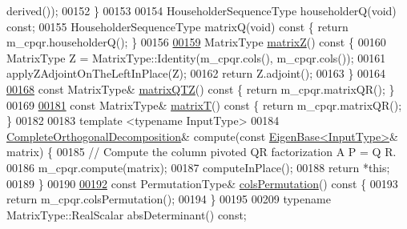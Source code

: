 \begin{DoxyCode}
      derived());
00152   \}
00153 
00154   HouseholderSequenceType householderQ(\textcolor{keywordtype}{void}) \textcolor{keyword}{const};
00155   HouseholderSequenceType matrixQ(\textcolor{keywordtype}{void})\textcolor{keyword}{ const }\{ \textcolor{keywordflow}{return} m\_cpqr.householderQ(); \}
00156 
\hyperlink{group___q_r___module_a4cd178f13aefe5189d4beeb3eb1c5897}{00159}   MatrixType \hyperlink{group___q_r___module_a4cd178f13aefe5189d4beeb3eb1c5897}{matrixZ}()\textcolor{keyword}{ const }\{
00160     MatrixType Z = MatrixType::Identity(m\_cpqr.cols(), m\_cpqr.cols());
00161     applyZAdjointOnTheLeftInPlace(Z);
00162     \textcolor{keywordflow}{return} Z.adjoint();
00163   \}
00164 
\hyperlink{group___q_r___module_ad89e2529fc1a8721239d9b6be9613a69}{00168}   \textcolor{keyword}{const} MatrixType& \hyperlink{group___q_r___module_ad89e2529fc1a8721239d9b6be9613a69}{matrixQTZ}()\textcolor{keyword}{ const }\{ \textcolor{keywordflow}{return} m\_cpqr.matrixQR(); \}
00169 
\hyperlink{group___q_r___module_a806213f5c96ff765265f47067229586d}{00181}   \textcolor{keyword}{const} MatrixType& \hyperlink{group___q_r___module_a806213f5c96ff765265f47067229586d}{matrixT}()\textcolor{keyword}{ const }\{ \textcolor{keywordflow}{return} m\_cpqr.matrixQR(); \}
00182 
00183   \textcolor{keyword}{template} <\textcolor{keyword}{typename} InputType>
00184   \hyperlink{group___q_r___module_class_eigen_1_1_complete_orthogonal_decomposition}{CompleteOrthogonalDecomposition}& compute(\textcolor{keyword}{const} 
      \hyperlink{group___core___module_struct_eigen_1_1_eigen_base}{EigenBase<InputType>}& matrix) \{
00185     \textcolor{comment}{// Compute the column pivoted QR factorization A P = Q R.}
00186     m\_cpqr.compute(matrix);
00187     computeInPlace();
00188     \textcolor{keywordflow}{return} *\textcolor{keyword}{this};
00189   \}
00190 
\hyperlink{group___q_r___module_a601c67a4a0bbe9c7b25b885279db9ff2}{00192}   \textcolor{keyword}{const} PermutationType& \hyperlink{group___q_r___module_a601c67a4a0bbe9c7b25b885279db9ff2}{colsPermutation}()\textcolor{keyword}{ const }\{
00193     \textcolor{keywordflow}{return} m\_cpqr.colsPermutation();
00194   \}
00195 
00209   \textcolor{keyword}{typename} MatrixType::RealScalar absDeterminant() \textcolor{keyword}{const};

\end{DoxyCode}
